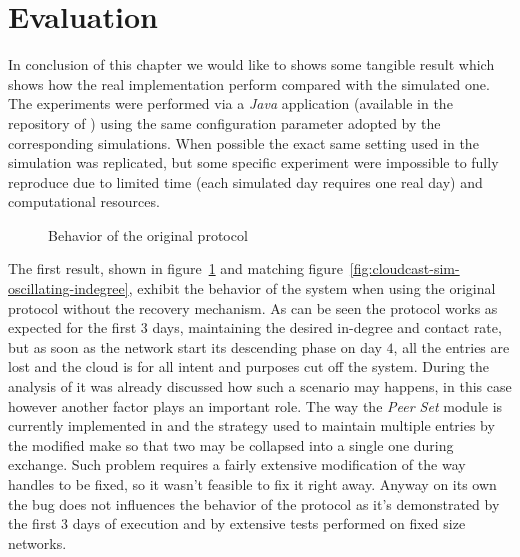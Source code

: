 \section{Evaluation}
In conclusion of this chapter we would like to shows some tangible
result which shows how the real implementation perform compared with
the simulated one.
The experiments were performed via a \emph{Java} application
(available in the repository of \jgrapes) using the same configuration
parameter adopted by the corresponding simulations. When possible the
exact same setting used in the simulation was replicated, but some
specific experiment were impossible to fully reproduce due to limited
time (each simulated day requires one real day) and computational
resources.

\begin{figure}[h!]
  \centering
  \caption{Behavior of the original \peersampling protocol}
  \label{fig:cloudcast-dynamic-original}
\end{figure}


The first result, shown in figure~\ref{fig:cloudcast-dynamic-original}
and matching figure~\ref{fig:cloudcast-sim-oscillating-indegree},
exhibit the behavior of the system when using the original protocol
without the recovery mechanism. As can be seen the protocol works as
expected for the first $3$ days, maintaining the desired \cloud
in-degree and contact rate, but as soon as the network start its
descending phase on day $4$, all the \cloud entries are lost and the
cloud is for all intent and purposes cut off the system. During the
analysis of \cloudcast it was already discussed how such a scenario
may happens, in this case however another factor plays an important
role. The way the \emph{Peer Set} module is currently implemented in
\grapes and the strategy used to maintain multiple \cloud entries by
the modified \cyclon make so that two \cloud \descriptor may be
collapsed into a single one during \view exchange. Such problem
requires a fairly extensive modification of the way \grapes handles
\descriptors to be fixed, so it wasn't feasible to fix it right
away. Anyway on its own the bug does not influences the behavior of
the protocol as it's demonstrated by the first $3$ days of execution
and by extensive tests performed on fixed size networks.

